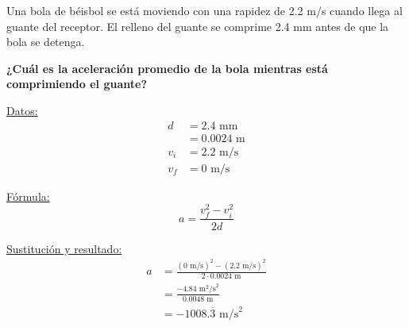 Una bola de béisbol se está moviendo con una rapidez de 2.2 m/s cuando llega al guante del receptor.
El relleno del guante se comprime 2.4 mm antes de que la bola se detenga.

\textbf{¿Cuál es la aceleración promedio de la bola mientras está comprimiendo el guante?}
\begin{minipage}[c]{\linewidth}
    \begin{solutionbox}{5cm}
        \begin{minipage}[t]{0.3\textwidth}
            \centering
            \underline{Datos:}
            \begin{align*}
                d   & =  2.4 \text{ mm}  \\
                    & = 0.0024 \text{ m} \\
                v_i & = 2.2  \text{ m/s} \\
                v_f & = 0  \text{ m/s}
            \end{align*}
        \end{minipage}%
        \begin{minipage}[t]{0.3\textwidth}
            \centering
            \underline{F\'ormula:}
            \begin{equation*}
                a=\frac{v_f^2-v_i^2}{2d}
            \end{equation*}
        \end{minipage}
        \begin{minipage}[t]{0.3\textwidth}
            \centering
            \underline{Sustituci\'on y resultado:}
            \begin{align*}
                a & =\frac{(0 \text{ m/s})^2-(2.2 \text{ m/s})^2}{2\cdot0.0024 \text{ m}} \\
                  & = \frac{- 4.84\text{ m}^2\text{/s}^2}{0.0048 \text{ m}}               \\
                  & =-1008.\overline{3} \text{ m/s}^2
            \end{align*}
        \end{minipage}
    \end{solutionbox}
\end{minipage}